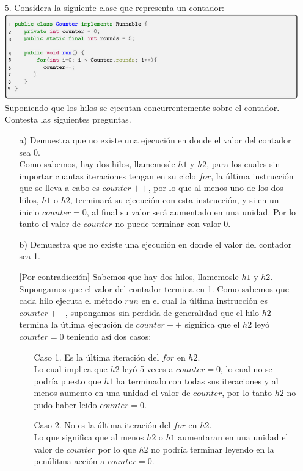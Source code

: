 \documentclass[12pt, letterpaper]{article}
\begin{document}
\begin{itemize}
\item[5. ] Considera la siguiente clase que representa un contador:\\
\includegraphics[width=\textwidth]{Codigo5}\\
Suponiendo que los hilos se ejecutan concurrentemente sobre el contador. Contesta las siguientes preguntas.
\begin{itemize}
\item[a) ] Demuestra que no existe una ejecución en donde el valor del contador sea 0.\\

Como sabemos, hay dos hilos, llamemosle $h1$ y $h2$, para los cuales sin importar cuantas iteraciones tengan en su ciclo $for$, la última instrucción que se lleva a cabo es $counter++$, por lo que al menos uno de los dos hilos, $h1$ o $h2$, terminará su ejecución con esta instrucción, y si en un inicio $counter = 0$, al final su valor será aumentado en una unidad. Por lo tanto el valor de $counter$ no puede terminar con valor 0. 

\item[b) ] Demuestra que no existe una ejecución en donde el valor del contador sea 1.

[Por contradicción] Sabemos que hay dos hilos, llamemosle $h1$ y $h2$. Supongamos que el valor del contador termina en 1. Como sabemos que cada hilo ejecuta el método $run$ en el cual la última instrucción es $counter++$, supongamos sin perdida de generalidad que el hilo $h2$ termina la útlima ejecución de $counter++$ significa que el $h2$ leyó $counter = 0$ teniendo así dos casos: 
\begin{itemize}
\item[Caso 1. ] Es la última iteración del $for$ en $h2$.\\
Lo cual implica que $h2$ leyó 5 veces a $counter = 0$, lo cual no se podría puesto que $h1$ ha terminado con todas sus iteraciones y al menos aumento en una unidad el valor de $counter$, por lo tanto $h2$ no pudo haber leido $counter = 0$.

\item[Caso 2. ] No es la última iteración del $for$ en $h2$.\\
Lo que significa que al menos $h2$ o $h1$ aumentaran en una unidad el valor de $counter$ por lo que $h2$ no podría terminar leyendo en la penúlitma acción a $counter = 0$.
\end{itemize} 


\end{itemize}
\end{itemize}
\end{document}
